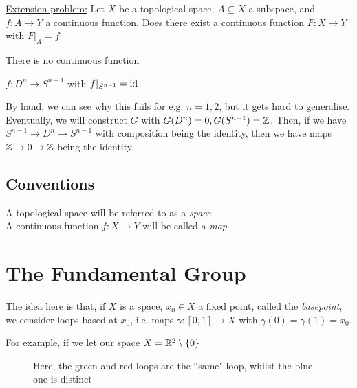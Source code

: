 \documentclass[10pt,a4paper]{article}
\begin{document}
\underline{Extension problem:} Let $X$ be a topological space, $A\subseteq X$ a subspace, and $f:A\rightarrow Y$ a continuous function. Does there exist a continuous function $F:X\rightarrow Y$ with $F|_A = f$
\begin{center}
\end{center}
\begin{theorem}
There is no continuous function
\begin{center} $f:D^n \rightarrow S^{n-1}$ with $f|_{S^{n-1}} = \operatorname{id}$\end{center}
\end{theorem}
By hand, we can see why this fails for e.g. $n=1, 2$, but it gets hard to generalise. Eventually, we will construct $G$ with $G(D^n) = 0, G(S^{n-1}) = \mathbb{Z}$. Then, if we have $S^{n-1} \rightarrow D^n \rightarrow S^{n-1}$ with composition being the identity, then we have maps $\mathbb{Z} \rightarrow 0 \rightarrow \mathbb{Z}$ being the identity.

\subsection*{Conventions}
A topological space will be referred to as a \emph{space}\\
A continuous function $f:X\rightarrow Y$ will be called a \emph{map}

\section{The Fundamental Group}
The idea here is that, if $X$ is a space, $x_0 \in X$ a fixed point, called the \emph{basepoint}, we consider loops based at $x_0$, i.e. maps $\gamma:[0,1] \rightarrow X$ with $\gamma(0) = \gamma(1) = x_0$.

For example, if we let our space $X = \mathbb{R}^2\setminus \{0\}$

\begin{figure}
\begin{center}
\end{center}
\caption*{Here, the green and red loops are the ``same" loop, whilst the blue one is distinct}
\end{figure}
\end{document}
